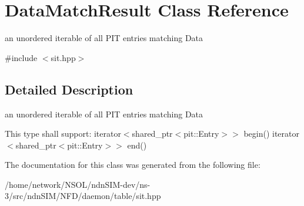 \hypertarget{classDataMatchResult}{}\section{Data\+Match\+Result Class Reference}
\label{classDataMatchResult}


an unordered iterable of all P\+IT entries matching Data  




{\ttfamily \#include $<$sit.\+hpp$>$}



\subsection{Detailed Description}
an unordered iterable of all P\+IT entries matching Data 

This type shall support\+: iterator$<$shared\+\_\+ptr$<$pit\+::\+Entry$>$$>$ begin() iterator$<$shared\+\_\+ptr$<$pit\+::\+Entry$>$$>$ end() 

The documentation for this class was generated from the following file\+:\begin{DoxyCompactItemize}
\item 
/home/network/\+N\+S\+O\+L/ndn\+S\+I\+M-\/dev/ns-\/3/src/ndn\+S\+I\+M/\+N\+F\+D/daemon/table/sit.\+hpp\end{DoxyCompactItemize}
